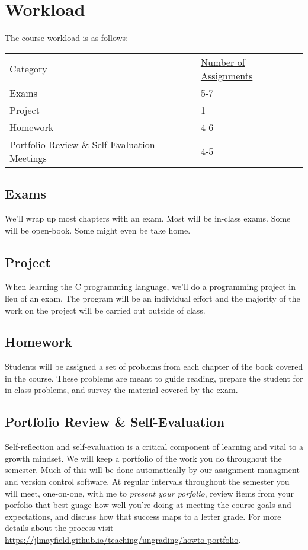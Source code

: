 \documentclass[10pt]{article}
\begin{document}
\section{Workload}

The course workload is as follows:
\begin{center}
  \begin{tabular}{ll}
    \underline{Category} & \underline{Number of Assignments} \\
    Exams & 5-7 \\
    Project & 1 \\
    Homework & 4-6 \\
    Portfolio Review \& Self Evaluation Meetings & 4-5
  \end{tabular}
\end{center}

\subsection*{Exams}

We'll wrap up most chapters with an exam. Most will be in-class exams. Some will be open-book. Some might even be take home.

\subsection*{Project}

When learning the C programming language, we'll do a programming project in lieu of an exam. The program will be an individual effort and the majority of the work on the project will be carried out outside of class. 

\subsection*{Homework}

Students will be assigned a set of problems from each chapter of the book covered in the course. These problems are meant to guide reading, prepare the student for in class problems, and survey the material covered by the exam.

\subsection*{Portfolio Review \& Self-Evaluation}

Self-reflection and self-evaluation is a critical component of learning and vital to a growth mindset.
We will keep a portfolio of the work you do throughout the semester. Much of this will be done automatically
by our assignment managment and version control software. At regular intervals throughout the semester you will
meet, one-on-one, with me to \textit{present your porfolio}, review items from your porfolio that best 
guage how well you're doing at meeting the course goals and expectations, and discuss how that success maps to 
a letter grade. For more details about the process visit \url{https://jlmayfield.github.io/teaching/ungrading/howto-portfolio}.
\end{document}
